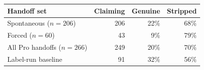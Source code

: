 \vspace{4pt}

\begin{tabular}{@{}lrrr@{}}
\toprule
Handoff set & Claiming & Genuine & Stripped \\
\midrule
Spontaneous ($n{=}206$) & 206 & 22\% & 68\% \\
Forced ($n{=}60$)       & \phantom{0}43 & \phantom{0}9\% & 79\% \\
\midrule
All Pro handoffs ($n{=}266$) & 249 & 20\% & 70\% \\
Label-run baseline           & \phantom{0}91 & 32\% & 56\% \\
\bottomrule
\end{tabular}

